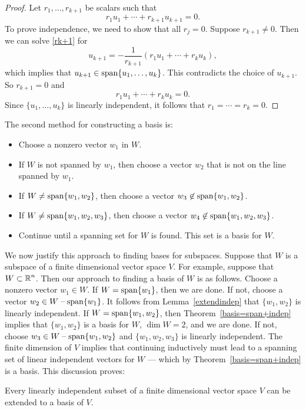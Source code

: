 \documentclass{ximera}
\begin{document}
\begin{proof}  Let $r_1,\ldots,r_{k+1}$ be scalars such that
\begin{equation}  \label{rk+1}
r_1u_1 + \cdots + r_{k+1}u_{k+1} = 0.
\end{equation}
To prove independence, we need to show that all $r_j=0$.
Suppose $r_{k+1}\neq 0$.  Then we can solve \eqref{rk+1} for
\[
u_{k+1} = -\frac{1}{r_{k+1}}(r_1u_1+\cdots +r_ku_k),
\]
which implies that $u_{k+1}\in {\rm span}\{u_1,\ldots,u_k\}$.  This
contradicts the choice of $u_{k+1}$.  So $r_{k+1}=0$ and
\[
r_1u_1 + \cdots + r_ku_k = 0.
\]
Since $\{u_1,\ldots,u_k\}$ is linearly independent, it follows
that $r_1=\cdots =r_k=0$.  \end{proof}

The second method for constructing a basis is:
\begin{itemize}
\item        Choose a nonzero vector $w_1$ in $W$.
\item If $W$ is not spanned by $w_1$, then choose a vector $w_2$
that is not on the line spanned by $w_1$.
\item        If $W\neq{\rm span}\{w_1,w_2\}$, then choose a vector
$w_3\not\in
{\rm span}\{w_1,w_2\}$.
\item        If $W\neq{\rm span}\{w_1,w_2,w_3\}$, then choose a vector
$w_4\not\in
{\rm span}\{w_1,w_2,w_3\}$.
\item Continue until a spanning set for $W$ is
found.  This set is a basis for $W$.
\end{itemize}

We now justify this approach to finding bases for subspaces.
Suppose that $W$ is a subspace of a finite dimensional vector
space $V$.  For example, suppose that $W\subset\mbox{$\Bbb{R}$}^n$. Then
our approach to finding a basis of $W$ is as follows.  Choose a
nonzero vector $w_1\in W$.  If $W={\rm span}\{w_1\}$, then we are
done.  If not, choose a vector $w_2\in W\;\mbox{--}\;{\rm span}\{w_1\}$.
It follows from Lemma~\ref{extendindep} that $\{w_1,w_2\}$ is
linearly independent.  If $W={\rm span}\{w_1,w_2\}$, then
Theorem~\ref{basis=span+indep} implies that $\{w_1,w_2\}$ is
a basis for $W$, $\dim W=2$, and we are done.  If not, choose
$w_3\in W\;\mbox{--}\;{\rm span}\{w_1,w_2\}$ and $\{w_1,w_2,w_3\}$ is
linearly independent.  The finite dimension of $V$ implies that
continuing inductively must lead to a spanning set of linear
independent vectors for $W$ --- which by
Theorem~\ref{basis=span+indep} is a basis. This discussion proves:
\begin{corollary}  \label{c:extendindependent}
Every linearly independent subset of a finite dimensional vector
space $V$ can be extended to a basis of $V$.
\end{corollary}
\end{document}
